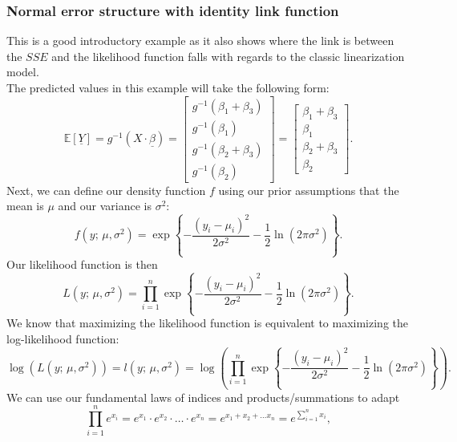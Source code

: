 \documentclass{article}
\begin{document}
\subsubsection{Normal error structure with identity link function}
This is a good introductory example as it also shows where the link is between the $SSE$ and the likelihood function falls with regards to the classic linearization model. \\
The predicted values in this example will take the following form:
\begin{equation}
    \mathbb{E}[\underline{Y}] = g^{-1}(X\cdot \underline{\beta}) = \begin{bmatrix} g^{-1}(\beta_1 + \beta_3) \\ g^{-1}(\beta_1) \\ g^{-1}(\beta_2 + \beta_3) \\ g^{-1}(\beta_2) \end{bmatrix} = \begin{bmatrix} \beta_1 + \beta_3 \\ \beta_1 \\ \beta_2 + \beta_3 \\ \beta_2 \end{bmatrix}.
\end{equation}
Next, we can define our density function $f$ using our prior assumptions that the mean is $\mu$ and our variance is $\sigma^2$:
\begin{equation}
    f(y;\,\mu,\sigma^2) = \exp{\left\{ -\frac{(y_i-\mu_i)^2}{2\sigma^2}-\frac{1}{2}\ln{(2\pi\sigma^2)} \right\}}.
\end{equation}
Our likelihood function is then
\begin{equation}
    L(y;\,\mu,\sigma^2) = \prod_{i=1}^n\exp{\left\{ -\frac{(y_i-\mu_i)^2}{2\sigma^2}-\frac{1}{2}\ln{(2\pi\sigma^2)} \right\}}.
\end{equation}
We know that maximizing the likelihood function is equivalent to maximizing the log-likelihood function:
\begin{equation}
    \log(L(y;\,\mu,\sigma^2)) = l(y;\,\mu,\sigma^2) = \log\left(\prod_{i=1}^n\exp{\left\{ -\frac{(y_i-\mu_i)^2}{2\sigma^2}-\frac{1}{2}\ln{(2\pi\sigma^2)} \right\}}\right).\label{eq:log_like}
\end{equation}
We can use our fundamental laws of indices and products/summations to adapt 
\begin{equation}
    \prod_{i=1}^n e^{x_i} = e^{x_1}\cdot e^{x_2}\cdot\ldots\cdot e^{x_n} = e^{x_1+x_2+\ldots x_n} = e^{\sum_{i=1}^n x_i},
\end{equation}
\end{document}
